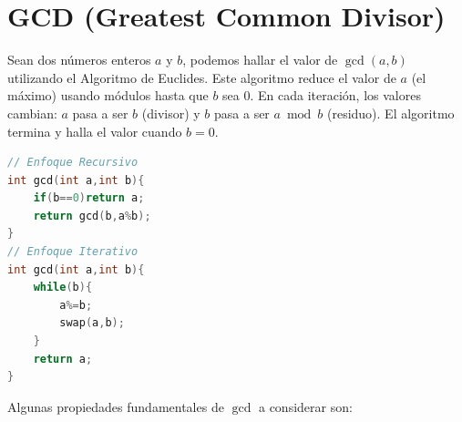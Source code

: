 \documentclass{article}
\begin{document}
\section*{GCD (Greatest Common Divisor)}
Sean dos números enteros $a$ y $b$, podemos hallar el valor de $\gcd(a,b)$ utilizando el Algoritmo de Euclides. Este algoritmo reduce el valor de $a$ (el máximo) usando módulos hasta que $b$ sea $0$. En cada iteración, los valores cambian: $a$ pasa a ser $b$ (divisor) y $b$ pasa a ser $a \bmod b$ (residuo). El algoritmo termina y halla el valor cuando $b=0$.
\begin{lstlisting}[language=C++]
// Enfoque Recursivo
int gcd(int a,int b){
    if(b==0)return a;
    return gcd(b,a%b);
}
// Enfoque Iterativo
int gcd(int a,int b){
    while(b){
        a%=b;
        swap(a,b);
    }
    return a;
}
\end{lstlisting}
Algunas propiedades fundamentales de $\gcd$ a considerar son:
\end{document}
